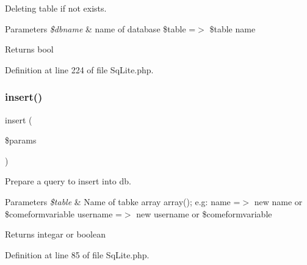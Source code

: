 Deleting table if not exists.


\begin{DoxyParams}{Parameters}
{\em \$dbname} & name of database \$table =$>$ \$table name\\
\hline
\end{DoxyParams}
\begin{DoxyReturn}{Returns}
bool 
\end{DoxyReturn}


Definition at line 224 of file Sq\+Lite.\+php.

\mbox{\label{class_zest_1_1_database_1_1_drives_1_1_sq_lite_1_1_sq_lite_a67366620fdfeaab4b480b6e4dca64deb}} 
\subsubsection{\texorpdfstring{insert()}{insert()}}
{\footnotesize\ttfamily insert (\begin{DoxyParamCaption}\item[{}]{\$params }\end{DoxyParamCaption})}

Prepare a query to insert into db.


\begin{DoxyParams}{Parameters}
{\em \$table} & Name of tabke array array(); e.\+g\+: \textquotesingle{}name\textquotesingle{} =$>$ \textquotesingle{}new name\textquotesingle{} or \$comeformvariable \textquotesingle{}username\textquotesingle{} =$>$ \textquotesingle{}new username\textquotesingle{} or \$comeformvariable\\
\hline
\end{DoxyParams}
\begin{DoxyReturn}{Returns}
integar or boolean 
\end{DoxyReturn}


Definition at line 85 of file Sq\+Lite.\+php.

\mbox{\label{class_zest_1_1_database_1_1_drives_1_1_sq_lite_1_1_sq_lite_ab0de61372611c058fe76c1a341691182}} 
